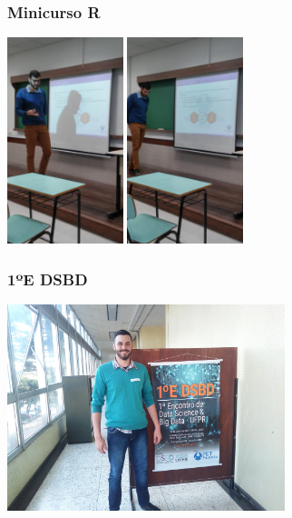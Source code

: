 \documentclass[10pt,
  aspectratio=169,
  serif,
  mathserif,
  professionalfont,
  compress,
  handout,
  ]{beamer}\usepackage[]{graphicx}\usepackage[]{color}
\begin{document}
\begin{frame}

\frametitle{Minicurso R}

\begin{center}
  \includegraphics[height=6cm]{img/mincursor.jpg}\hspace{2em}
  \includegraphics[height=6cm]{img/minicursor2.jpg}
\end{center}

\end{frame}


\begin{frame}

\frametitle{1ºE DSBD}

\begin{center}
  \includegraphics[height=6cm]{img/dsbd.jpg}
\end{center}

\end{frame}
\end{document}
